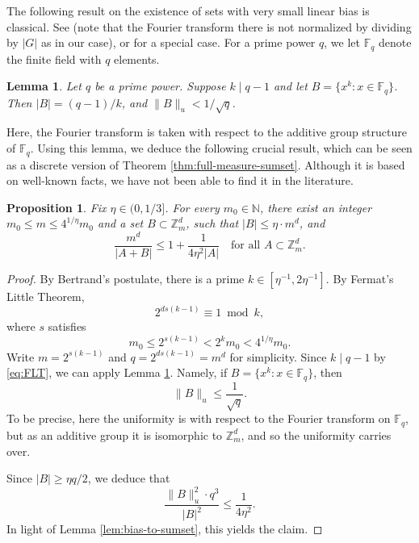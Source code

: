 \documentclass[12pt]{amsart}
\newtheorem{proposition}[theorem]{Proposition}
\newtheorem{lemma}[theorem]{Lemma}
\def\Z{{\mathbb{Z}}}
\def\N{{\mathbb{N}}}
\numberwithin{theorem}{section}
\numberwithin{equation}{section}
\begin{document}
The following result on the existence of sets with very small linear bias is classical. See \cite[Theorem 6.8]{BabaiFourier} (note that the Fourier transform there is not normalized by dividing by $|G|$ as in our case), or \cite[Lemma 4.14]{TaoVu06} for a special case. For a prime power $q$, we let $\mathbb{F}_q$ denote the finite field with $q$ elements.
\begin{lemma} \label{lem:Gauss-sum}
    Let $q$ be a prime power. Suppose $k\mid q-1$ and let $B = \{ x^k: x\in \mathbb{F}_q\}$. Then $|B|=(q-1)/k$, and $\|B\|_u < 1/\sqrt{q}$.
\end{lemma}
Here, the Fourier transform is taken with respect to the additive group structure of $\mathbb{F}_q$.
Using this lemma, we deduce the following crucial result, which can be seen as a discrete version of Theorem \ref{thm:full-measure-sumset}. Although it is based on well-known facts, we have not been able to find it in the literature.
\begin{proposition} \label{prop:large-sumset}
    Fix $\eta\in (0,1/3]$. For every $m_0\in\N$, there exist an integer $m_0\le m \le 4^{1/\eta} m_0$ and a set $B\subset\Z_m^d$, such that $|B|\le \eta\cdot m^d$, and
    \[
      \frac{m^d}{|A+B|} \le 1+\frac{1}{4\eta^2 |A|} \quad\text{for all } A\subset \Z_m^d.
    \]
\end{proposition}
\begin{proof}
    By Bertrand's postulate, there is a prime $k\in [\eta^{-1},2\eta^{-1}]$. By Fermat's Little Theorem,
    \begin{equation} \label{eq:FLT}
        2^{d s(k-1)}\equiv 1 \bmod k,
    \end{equation}
    where $s$ satisfies
    \[
        m_0 \le 2^{s(k-1)} < 2^k m_0 < 4^{1/\eta} m_0.
    \]
    Write $m=2^{s(k-1)}$ and $q= 2^{d s(k-1)}=m^d$ for simplicity. Since $k\mid q-1$ by \eqref{eq:FLT}, we can apply Lemma \ref{lem:Gauss-sum}. Namely, if $B=\{ x^k: x\in \mathbb{F}_q\}$, then
    \[
        \|B\|_u \le \frac{1}{\sqrt{q}}.
    \]
    To be precise, here the uniformity is with respect to the Fourier transform on $\mathbb{F}_{q}$, but as an additive group it is isomorphic to $\Z_m^d$, and so the uniformity carries over.

    Since $|B|\ge \eta q/2$, we deduce that
    \[
        \frac{\|B\|_u^2 \cdot q^3}{|B|^2} \le \frac{1}{4\eta^{2}}.
    \]
    In light of Lemma \ref{lem:bias-to-sumset}, this yields the claim.
\end{proof}
\end{document}
